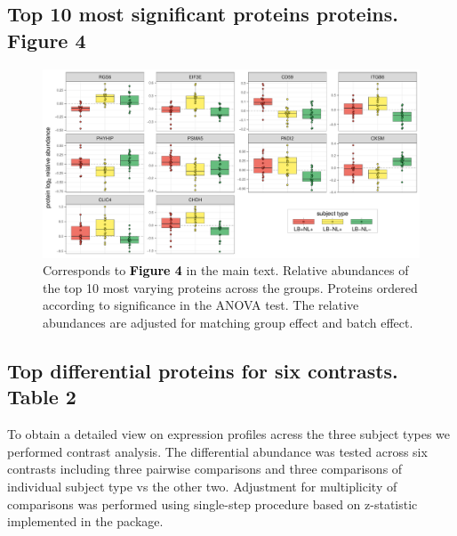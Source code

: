 \documentclass[11pt]{article}\usepackage[]{graphicx}\usepackage[usenames,dvipsnames]{color}
\newenvironment{knitrout}{}{} %
\begin{document}
\subsection{Top 10 most significant proteins proteins. Figure 4}
\begin{figure}[h!]
\center
\begin{minipage}{1\textwidth}
\begin{knitrout}
\color{fgcolor}

{\centering \includegraphics[width=1\textwidth]{figure/individual_proteins-1} 

}



\end{knitrout}
\caption{Corresponds to
\textcolor{black}{\colorbox{highlighter}{\textbf{Figure 4}}} in the main text.
Relative abundances of the top 10 most varying proteins across the groups. Proteins ordered according to significance in the ANOVA test. The relative abundances are adjusted for matching group effect and batch effect.}
\label{fig:Top10IndProt}
\end{minipage}
\end{figure}







\clearpage

\subsection{Top differential proteins for six contrasts. Table 2}
To obtain a detailed view on expression profiles acress the three subject types
we performed contrast analysis. The differential abundance was tested across six
contrasts including three pairwise comparisons and three comparisons of 
individual subject type vs the other two. Adjustment for multiplicity of 
comparisons was performed using single-step procedure based on z-statistic 
implemented in the \textbf{} package.
\end{document}
